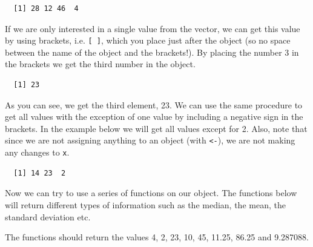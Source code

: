 \documentclass[12pt,oneside]{reedthesis}
\theoremstyle{definition}
\theoremstyle{definition}
\theoremstyle{definition}
\theoremstyle{remark}
\begin{document}
  \begin{Shaded}
  \begin{Highlighting}[]
  \OperatorTok{*}\StringTok{ }
  \end{Highlighting}
  \end{Shaded}
  \begin{verbatim}
  [1] 28 12 46  4
  \end{verbatim}
  If we are only interested in a single value from the vector, we can get
  this value by using brackets, i.e. \texttt{{[}\ {]}}, which you place
  just after the object (so no space between the name of the object and
  the brackets!). By placing the number 3 in the brackets we get the third
  number in the object.
  \begin{Shaded}
  \begin{Highlighting}[]
  \NormalTok{x[}\NormalTok{]}
  \end{Highlighting}
  \end{Shaded}
  \begin{verbatim}
  [1] 23
  \end{verbatim}
  As you can see, we get the third element, 23. We can use the same
  procedure to get all values with the exception of one value by including
  a negative sign in the brackets. In the example below we will get all
  values except for 2. Also, note that since we are not assigning anything
  to an object (with \texttt{\textless{}-}), we are not making any changes
  to \texttt{x}.
  \begin{Shaded}
  \begin{Highlighting}[]
  \NormalTok{x[}\OperatorTok{-}\NormalTok{]}
  \end{Highlighting}
  \end{Shaded}
  \begin{verbatim}
  [1] 14 23  2
  \end{verbatim}
  Now we can try to use a series of functions on our object. The functions
  below will return different types of information such as the median, the
  mean, the standard deviation etc.
  \begin{Shaded}
  \begin{Highlighting}[]
  \end{Highlighting}
  \end{Shaded}
  The functions should return the values 4, 2, 23, 10, 45, 11.25, 86.25
  and 9.287088.
  
\end{document}
